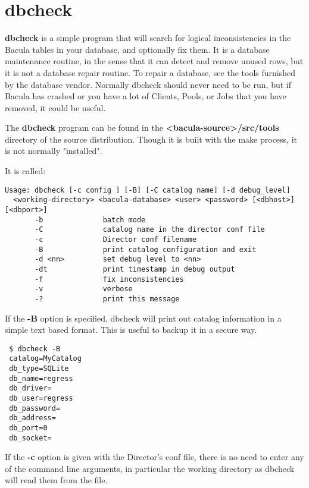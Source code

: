 \section{dbcheck}
\label{dbcheck}
{\bf dbcheck} is a simple program that will search for logical
inconsistencies in the Bacula tables in your database, and optionally fix them.
It is a database maintenance routine, in the sense that it can
detect and remove unused rows, but it is not a database repair
routine. To repair a database, see the tools furnished by the
database vendor.  Normally dbcheck should never need to be run,
but if Bacula has crashed or you have a lot of Clients, Pools, or
Jobs that you have removed, it could be useful.

The {\bf dbcheck} program can be found in
the {\bf {\textless}bacula-source{\textgreater}/src/tools} directory of the source
distribution. Though it is built with the make process, it is not normally
"installed".

It is called:

\footnotesize
\begin{verbatim}
Usage: dbcheck [-c config ] [-B] [-C catalog name] [-d debug_level]
  <working-directory> <bacula-database> <user> <password> [<dbhost>] [<dbport>]
       -b              batch mode
       -C              catalog name in the director conf file
       -c              Director conf filename
       -B              print catalog configuration and exit
       -d <nn>         set debug level to <nn>
       -dt             print timestamp in debug output
       -f              fix inconsistencies
       -v              verbose
       -?              print this message
\end{verbatim}
\normalsize

If the \textbf{-B} option is specified, dbcheck will print out catalog
information in a simple text based format. This is useful to backup it in a
secure way.

\begin{verbatim}
 $ dbcheck -B
 catalog=MyCatalog
 db_type=SQLite
 db_name=regress
 db_driver=
 db_user=regress
 db_password=
 db_address=
 db_port=0
 db_socket=
\end{verbatim} %

If the {\bf -c} option is given with the Director's conf file, there is no
need to enter any of the command line arguments, in particular the working
directory as dbcheck will read them from the file.

